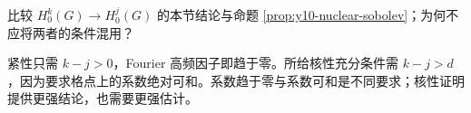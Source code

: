 \begin{exercise}[紧性与核性的阶差]\label{ex:y10-orders}
比较 $H_0^k(G)\to H_0^j(G)$ 的本节结论与命题 \ref{prop:y10-nuclear-sobolev}；为何不应将两者的条件混用？
\end{exercise}
\begin{solution}
紧性只需 $k-j>0$，Fourier 高频因子即趋于零。所给核性充分条件需 $k-j>d$，因为要求格点上的系数绝对可和。系数趋于零与系数可和是不同要求；核性证明提供更强结论，也需要更强估计。
\end{solution}
